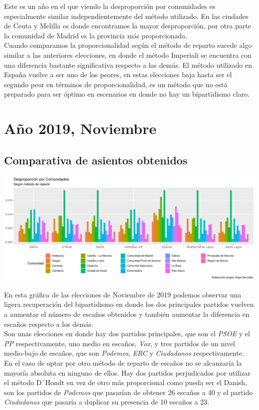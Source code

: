 \documentclass[12pt,a4paper,]{book}
\numberwithin{dummy}{section}
\theoremstyle{ocrenumbox}
\theoremstyle{blacknumex}
\theoremstyle{blacknumbox}
\theoremstyle{ocrenum}
\theoremstyle{ocrenum}
\begin{document}
Este es un año en el que viendo la desproporción por comunidades es
especialmente similar independientemente del método utilizado. En las
ciudades de Ceuta y Melilla es donde encontramos la mayor desproporción,
por otra parte la comunidad de Madrid es la provincia más
proporcionada.\\
Cuando comparamos la proporcionalidad según el método de reparto sucede
algo similar a las anteriores elecciones, en donde el método Imperiali
se encuentra con una diferencia bastante significativa respecto a las
demás. El método utilizado en España vuelve a ser uno de los peores, en
estas elecciones baja hasta ser el segundo peor en términos de
proporcionalidad, es un método que no está preparado para ser óptimo en
escenarios en donde no hay un bipartidismo claro.

\hypertarget{auxf1o-2019-noviembre}{%
\section{Año 2019, Noviembre}\label{auxf1o-2019-noviembre}}

\hypertarget{comparativa-de-asientos-obtenidos-14}{%
\subsection{Comparativa de asientos
obtenidos}\label{comparativa-de-asientos-obtenidos-14}}

\begin{center}\includegraphics[width=1\linewidth]{figurasR/unnamed-chunk-120-1} \end{center}

En esta gráfica de las elecciones de Noviembre de 2019 podemos observar
una ligera recuperación del bipartidismo en donde los dos principales
partidos vuelven a aumentar el número de escaños obtenidos y también
aumentar la diferencia en escaños respecto a los demás.\\
Son unas elecciones en donde hay dos partidos principales, que son el
\emph{PSOE} y el \emph{PP} respectivamente, uno medio en escaños,
\emph{Vox}, y tres partidos de un nivel medio-bajo de escaños, que son
\emph{Podemos}, \emph{ERC} y \emph{Ciudadanos} respectivamente.\\
En el caso de optar por otro método de reparto de escaños no se
alcanzaría la mayoría absoluta en ninguno de ellos. Hay dos partidos
perjudicados por utilizar el método D´Hondt en vez de otro más
proporcional como pueda ser el Danish, son los partidos de
\emph{Podemos} que pasarían de obtener 26 escaños a 40 y el partido
\emph{Ciudadanos} que pasaría a duplicar su presencia de 10 escaños a
23.
\end{document}
